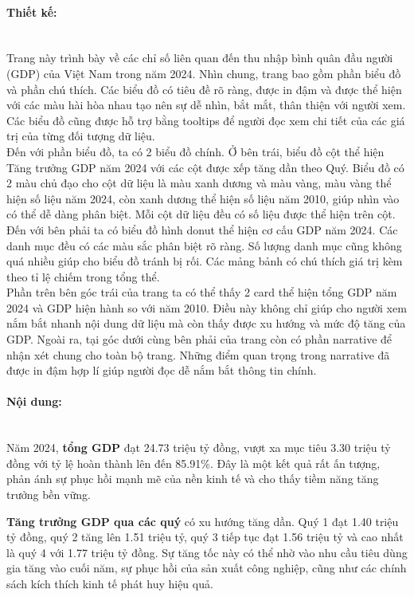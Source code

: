 \documentclass[a4paper]{report}
\begin{document}
{{\paragraph{Thiết kế: } \mbox{}\\
Trang này trình bày về các chỉ số liên quan đến thu nhập bình quân đầu người (GDP) của Việt Nam trong năm 2024. Nhìn chung, trang bao gồm phần biểu đồ và phần chú thích. Các biểu đồ có tiêu đề rõ ràng, được in đậm và được thể hiện với các màu hài hòa nhau tạo nên sự dễ nhìn, bắt mắt, thân thiện với người xem. Các biểu đồ cũng được hỗ trợ bằng tooltips để người đọc xem chi tiết của các giá trị của từng đối tượng dữ liệu.\\
Đến với phần biểu đồ, ta có 2 biểu đồ chính. Ở bên trái, biểu đồ cột thể hiện Tăng trưởng GDP năm 2024 với các cột được xếp tăng dần theo Quý. Biểu đồ có 2 màu chủ đạo cho cột dữ liệu là màu xanh dương và màu vàng, màu vàng thể hiện số liệu năm 2024, còn xanh dương thể hiện số liệu năm 2010, giúp nhìn vào có thể dễ dàng phân biệt. Mỗi cột dữ liệu đều có số liệu được thể hiện trên cột. Đến với bên phải ta có biểu đồ hình donut thể hiện cơ cấu GDP năm 2024. Các danh mục đều có các màu sắc phân biệt rõ ràng. Số lượng danh mục cũng không quá nhiều giúp cho biểu đồ tránh bị rối. Các mảng bảnh có chú thích giá trị kèm theo tỉ lệ chiếm trong tổng thể.\\
Phần trên bên góc trái của trang ta có thể thấy 2 card thể hiện tổng GDP năm 2024 và GDP hiện hành so với năm 2010. Điều này không chỉ giúp cho người xem nắm bắt nhanh nội dung dữ liệu mà còn thấy được xu hướng và mức độ tăng của GDP. Ngoài ra, tại góc dưới cùng bên phải của trang còn có phần narrative để nhận xét chung cho toàn bộ trang. Những điểm quan trọng trong narrative đã được in đậm hợp lí giúp người đọc dễ nắm bắt thông tin chính.

\paragraph{Nội dung: } \mbox{}\\
Năm 2024, \textbf{tổng GDP} đạt 24.73 triệu tỷ đồng, vượt xa mục tiêu 3.30 triệu tỷ đồng với tỷ lệ hoàn thành lên đến 85.91\%. Đây là một kết quả rất ấn tượng, phản ánh sự phục hồi mạnh mẽ của nền kinh tế và cho thấy tiềm năng tăng trưởng bền vững.  

\textbf{Tăng trưởng GDP qua các quý} có xu hướng tăng dần. Quý 1 đạt 1.40 triệu tỷ đồng, quý 2 tăng lên 1.51 triệu tỷ, quý 3 tiếp tục đạt 1.56 triệu tỷ và cao nhất là quý 4 với 1.77 triệu tỷ đồng. Sự tăng tốc này có thể nhờ vào nhu cầu tiêu dùng gia tăng vào cuối năm, sự phục hồi của sản xuất công nghiệp, cũng như các chính sách kích thích kinh tế phát huy hiệu quả.  

}}
\end{document}
